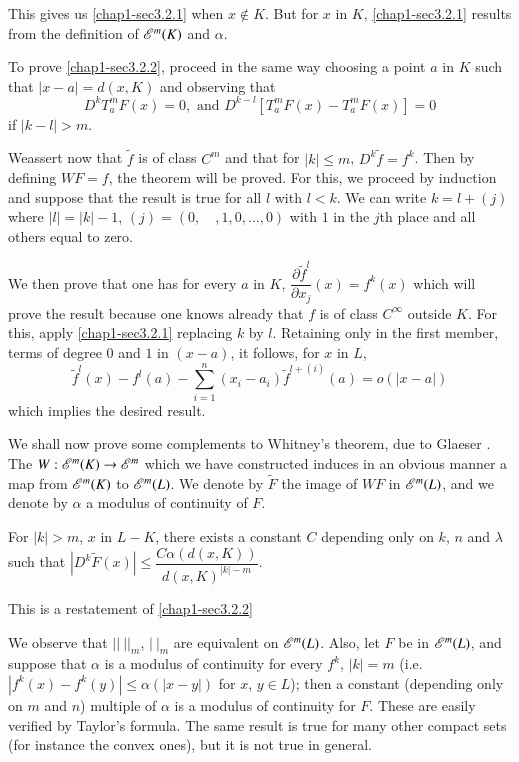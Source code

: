 This gives us \eqref{chap1-sec3.2.1} when $x\not\in K$. But for $x$ in $K$, \eqref{chap1-sec3.2.1} results from the definition of $\mathscr{E}^{m}(K)$ and $\alpha$.

To prove \eqref{chap1-sec3.2.2}, proceed in the same way choosing a point $a$ in $K$ such that $|x-a|=d(x,K)$ and observing that
$$
D^{k}T^{m}_{a}F(x)=0,\text{ and } D^{k-l}[T^{m}_{a}F(x)-T^{m}_{a}F(x)]=0
$$
if $|k-l|>m$.

We\pageoriginale assert now that $\widetilde{f}$ is of class $C^{m}$ and that for $|k|\leq m$, $D^{k}\widetilde{f}=f^{k}$. Then by defining $WF=f$, the theorem will be proved. For this, we proceed by induction and suppose that the result is true for all $l$ with $l<k$. We can write $k=l+(j)$ where $|l|=|k|-1$, $(j)=(0,\quad ,1,0,\ldots,0)$ with $1$ in the $j$th place and all others equal to zero.

We then prove that one has for every $a$ in $K$, $\dfrac{\partial \widetilde{f}^{l}}{\partial x_{j}}(x)=f^{k}(x)$ which will prove the result because one knows already that $f$ is of class $C^{\infty}$ outside $K$. For this, apply \eqref{chap1-sec3.2.1} replacing $k$ by $l$. Retaining only in the first member, terms of degree $0$ and $1$ in $(x-a)$, it follows, for $x$ in $L$,
$$
\widetilde{f}^{l}(x)-f^{l}(a)-\sum\limits^{n}_{i=1}(x_{i}-a_{i})\widetilde{f}^{l+(i)}(a)=o(|x-a|)
$$
which implies the desired result.

We shall now prove some complements to Whitney's theorem, due to Glaeser \cite{G. Glaeser: 1}. The $W:\mathscr{E}^{m}(K)\to \mathscr{E}^{m}$ which we have constructed induces in an obvious manner a map from $\mathscr{E}^{m}(K)$ to $\mathscr{E}^{m}(L)$. We denote by $\widetilde{F}$ the image of $WF$ in $\mathscr{E}^{m}(L)$, and we denote by $\alpha$ a modulus of continuity of $F$.

\begin{Complement}\label{chap1-com3.3}
For $|k|>m$, $x$ in $L-K$, there exists a constant $C$ depending only on $k$, $n$ and $\lambda$ such that $|D^{k}\widetilde{F}(x)|\leq \dfrac{C\alpha(d(x,K))}{d(x,K)^{|k|-m}}$.
\end{Complement}

This is a restatement of \eqref{chap1-sec3.2.2}

\begin{remark}\label{chap1-rem3.4}
We observe that $||~||_{m}$, $|~|_{m}$ are equivalent on $\mathscr{E}^{m}(L)$. Also, let $F$ be in $\mathscr{E}^{m}(L)$, and suppose that $\alpha$ is a modulus of continuity for every $f^{k}$, $|k|=m$ (i.e. $|f^{k}(x)-f^{k}(y)|\leq \alpha(|x-y|)$ for $x$, $y\in L$); then a constant (depending only on $m$ and $n$) multiple of $\alpha$ is a modulus of continuity for $F$. These are easily verified by Taylor's formula. The same result is true for many other compact sets (for instance the convex ones), but it is not true in general.
\end{remark}


